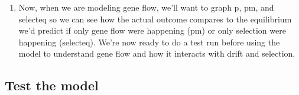 \begin{enumerate}
  \begin{itemize}
  \tightlist
  \item
    In short, it says that IF all of the genotypes have the same
    fitness, THEN the equilibrium value will be whatever p is to begin
    with, p0. ELSE, if genotype fitnesses are not equal, THEN, IF A1A2
    has the highest OR lowest fitness, THEN use the equation for
    heterozygote advantage to figure out the equilibrium. ELSE, IF one
    of the homozygotes has the highest fitness, THEN IF A1A1 has the
    highest fitness set equilibrium to p=1.0, ELSE set equilibrium to
    p=0 (because A2A2 has the highest fitness and will reach fixation).
  \end{itemize}
\item
  Now, when we are modeling gene flow, we'll want to graph p, pm, and
  selecteq so we can see how the actual outcome compares to the
  equilibrium we'd predict if only gene flow were happening (pm) or only
  selection were happening (selecteq). We're now ready to do a test run
  before using the model to understand gene flow and how it interacts
  with drift and selection.
\end{enumerate}

\subsection{Test the model}\label{test-the-model}

